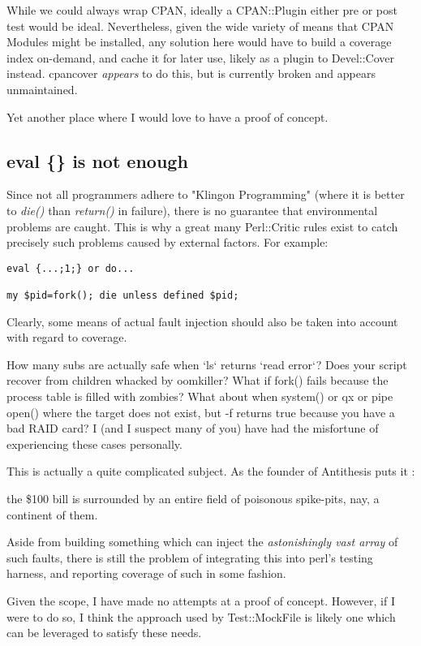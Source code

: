 \documentclass{article}
\begin{document}
While we could always wrap CPAN, ideally a CPAN::Plugin either pre or post test would be ideal.
Nevertheless, given the wide variety of means that CPAN Modules might be installed, any solution here would have to build a coverage index on-demand, and cache it for later use, likely as a plugin to Devel::Cover instead.
cpancover \textit{appears} to do this, but is currently broken and appears unmaintained.

Yet another place where I would love to have a proof of concept.

\subsection{eval \{\} is not enough}

Since not all programmers adhere to "Klingon Programming" (where it is better to \textit{die()} than \textit{return()} in failure),
there is no guarantee that environmental problems are caught.
This is why a great many Perl::Critic rules exist to catch precisely such problems caused by external factors.
For example:
\begin{lstlisting}
eval {...;1;} or do...

my $pid=fork(); die unless defined $pid;
\end{lstlisting}
Clearly, some means of actual fault injection should also be taken into account with regard to coverage.

How many subs are actually safe when `ls` returns `read error`?
Does your script recover from children whacked by oomkiller?
What if fork() fails because the process table is filled with zombies? \cite{gsb2}
What about when system() or qx{} or pipe open() where the target does not exist, but -f returns true because you have a bad RAID card?
I (and I suspect many of you) have had the misfortune of experiencing these cases personally.

This is actually a quite complicated subject.  As the founder of Antithesis puts it \cite{antithesis}:
\begin{displayquote}
the \$100 bill is surrounded by an entire field of poisonous spike-pits, nay, a continent of them.
\end{displayquote}
Aside from building something which can inject the \textit{astonishingly vast array} of such faults,
there is still the problem of integrating this into perl's testing harness, and reporting coverage of such in some fashion.

Given the scope, I have made no attempts at a proof of concept.
However, if I were to do so, I think the approach used by Test::MockFile \cite{mf} is likely one which can be leveraged to satisfy these needs.
\end{document}
